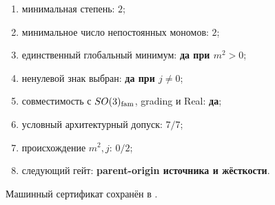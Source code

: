 \begin{protocol}\begin{enumerate}
\item минимальная степень: \textbf{$2$};
\item минимальное число непостоянных мономов: \textbf{$2$};
\item единственный глобальный минимум: \textbf{да при $m^2>0$};
\item ненулевой знак выбран: \textbf{да при $j\ne0$};
\item совместимость с $SO(3)_{\rm fam}$, grading и Real: \textbf{да};
\item условный архитектурный допуск: \textbf{$7/7$};
\item происхождение $m^2,j$: \textbf{$0/2$};
\item следующий гейт: \textbf{parent-origin источника и жёсткости}.
\end{enumerate}\end{protocol}

Машинный сертификат сохранён в
.